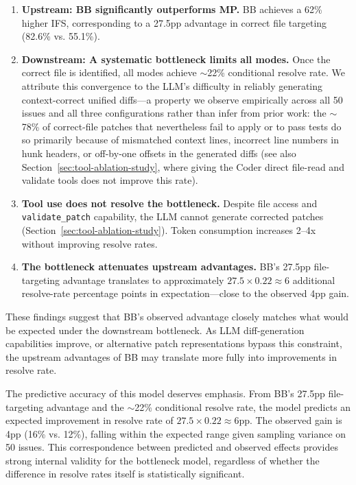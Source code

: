 \documentclass{ieeeaccess}
\begin{document}
\begin{enumerate}
\item \textbf{Upstream: BB significantly outperforms MP.} BB achieves a 62\% higher IFS, corresponding to a 27.5pp advantage in correct file targeting (82.6\% vs. 55.1\%).

\item \textbf{Downstream: A systematic bottleneck limits all modes.} Once the correct file is identified, all modes achieve $\sim$22\% conditional resolve rate. We attribute this convergence to the LLM's difficulty in reliably generating context-correct unified diffs---a property we observe empirically across all 50 issues and all three configurations rather than infer from prior work: the $\sim$78\% of correct-file patches that nevertheless fail to apply or to pass tests do so primarily because of mismatched context lines, incorrect line numbers in hunk headers, or off-by-one offsets in the generated diffs (see also Section~\ref{sec:tool-ablation-study}, where giving the Coder direct file-read and validate tools does not improve this rate).

\item \textbf{Tool use does not resolve the bottleneck.} Despite file access and \texttt{validate\_patch} capability, the LLM cannot generate corrected patches (Section~\ref{sec:tool-ablation-study}). Token consumption increases 2--4x without improving resolve rates.

\item \textbf{The bottleneck attenuates upstream advantages.} BB's 27.5pp file-targeting advantage translates to approximately $27.5 \times 0.22 \approx 6$ additional resolve-rate percentage points in expectation---close to the observed 4pp gain.

\end{enumerate}
These findings suggest that BB's observed advantage closely matches what would be expected under the downstream bottleneck. As LLM diff-generation capabilities improve, or alternative patch representations bypass this constraint, the upstream advantages of BB may translate more fully into improvements in resolve rate.

The predictive accuracy of this model deserves emphasis. From BB's 27.5pp file-targeting advantage and the $\sim$22\% conditional resolve rate, the model predicts an expected improvement in resolve rate of $27.5 \times 0.22 \approx 6$pp. The observed gain is 4pp (16\% vs. 12\%), falling within the expected range given sampling variance on 50 issues. This correspondence between predicted and observed effects provides strong internal validity for the bottleneck model, regardless of whether the difference in resolve rates itself is statistically significant.
\end{document}
